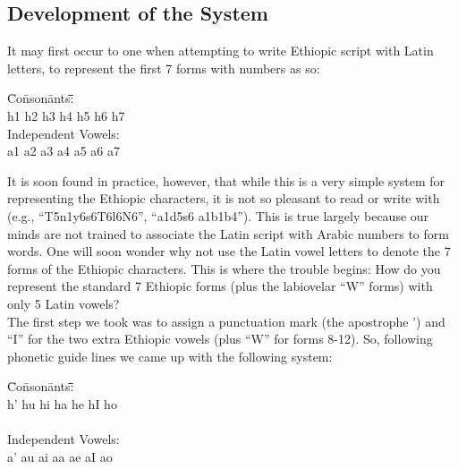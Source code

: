 \subsection{Development of the System}
 

 It may first occur to one when attempting to write Ethiopic script
 with Latin letters, to represent the first 7 forms with numbers as so: 

\begin{tabbing}
\hspace{0.2in}\=Co\=nson\=ants\=:\hspace{0.2in}\= \hspace{0.25in}\= \hspace{0.3in}\=  \hspace{0.25in}\= \\
      \>\>h1   \>h2   \>h3   \>h4   \>h5   \>h6   \>h7 \\
 
      \>Independent Vowels: \\
      \>\>a1   \>a2   \>a3   \>a4   \>a5   \>a6   \>a7 
\end{tabbing}
 
 It is soon found in practice, however, that while this is a very simple
 system for representing the Ethiopic characters, it is not so pleasant to read
 or write with (e.g., ``T5n1y6s6T6l6N6'', ``a1d5s6 a1b1b4'').  This is true
 largely because our minds are not trained to associate the Latin script with
 Arabic numbers to form words.  One will soon wonder why not use the Latin
 vowel letters to denote the 7 forms of the Ethiopic characters.  This is
 where the trouble begins:  How do you represent the standard 7 Ethiopic forms
 (plus the labiovelar ``W'' forms) with only 5 Latin vowels?    \\
 
 The first step we took was to assign a punctuation mark (the apostrophe ')
 and ``I'' for the two extra Ethiopic vowels (plus ``W'' for forms 8-12).  So, 
 following phonetic guide lines we came up with the following system:

\begin{tabbing}
\hspace{0.2in}\=Co\=nson\=ants\=:\hspace{0.2in}\= \hspace{0.25in}\= \hspace{0.3in}\=  \hspace{0.25in}\= \\
      \>\>h'   \>hu   \>hi   \>ha   \>he   \>hI   \>ho \\
 \ \\
      \>Independent Vowels: \\
      \>\>a'   \>au   \>ai   \>aa   \>ae   \>aI   \>ao 
\end{tabbing}
 
